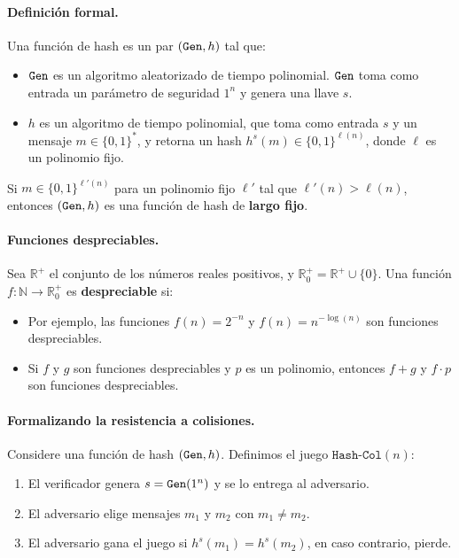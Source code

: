 \paragraph{Definición formal.} Una función de hash es un par $(\texttt{Gen}, h)$ tal que:
\begin{itemize}
    \item $\texttt{Gen}$ es un algoritmo aleatorizado de tiempo polinomial. $\texttt{Gen}$ toma como entrada un parámetro de seguridad $1^n$ y genera una llave $s$.
    \item $h$ es un algoritmo de tiempo polinomial, que toma como entrada $s$ y un mensaje $m \in \{0,1\}^*$, y retorna un hash $h^s(m) \in \{0,1\}^{\ell(n)}$, donde $\ell$ es un polinomio fijo.
\end{itemize}

Si $m \in \{0,1\}^{\ell'(n)}$ para un polinomio fijo $\ell'$ tal que $\ell'(n) > \ell(n)$, entonces $(\texttt{Gen}, h)$ es una función de hash de \textbf{largo fijo}.

\paragraph{Funciones despreciables.} Sea $\mathbb{R}^+$ el conjunto de los números reales positivos, y $\mathbb{R}_0^+ = \mathbb{R}^+ \cup \{0\}$. Una función $f: \mathbb{N} \to \mathbb{R}_0^+$ es \textbf{despreciable} si:
\begin{itemize}
    \item Por ejemplo, las funciones $f(n) = 2^{-n}$ y $f(n) = n^{-\log(n)}$ son funciones despreciables.
    \item Si $f$ y $g$ son funciones despreciables y $p$ es un polinomio, entonces $f + g$ y $f \cdot p$ son funciones despreciables.
\end{itemize}

\paragraph{Formalizando la resistencia a colisiones.} Considere una función de hash $(\texttt{Gen}, h)$. Definimos el juego $\texttt{Hash-Col}(n)$:
\begin{enumerate}
    \item El verificador genera $s = \texttt{Gen}(1^n)$ y se lo entrega al adversario.
    \item El adversario elige mensajes $m_1$ y $m_2$ con $m_1 \neq m_2$.
    \item El adversario gana el juego si $h^s(m_1) = h^s(m_2)$, en caso contrario, pierde.
\end{enumerate}


